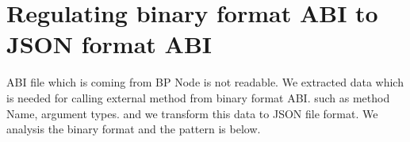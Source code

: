 \section{Regulating binary format ABI to JSON format ABI}
ABI file which is coming from BP Node is not readable. 
We extracted data which is needed for calling external method from binary format ABI. such as method Name, argument types. and we transform this data to JSON file format. 
We analysis the binary format and the pattern is below.

